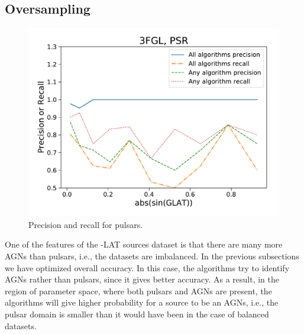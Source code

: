\subsection{Oversampling}


\begin{figure}[h]
\includegraphics[width=\twopicsp\textwidth]{plots/All_algs_3FGL_precision_recall.pdf}
\caption{Precision and recall for pulsars.}
\label{fig:prec_recall}
\end{figure}

One of the features of the \Fermi-LAT sources dataset is that there are many more AGNs than pulsars, i.e., the datasets are imbalanced.
In the previous subsections we have optimized overall accuracy. In this case, the algorithms try to identify AGNs rather than pulsars,
since it gives better accuracy. As a result, in the region of parameter space, where both pulsars and AGNs are present, the algorithms
will give higher probability for a source to be an AGNs, i.e., the pulsar domain is smaller than it would have been in the case of balanced datasets.

